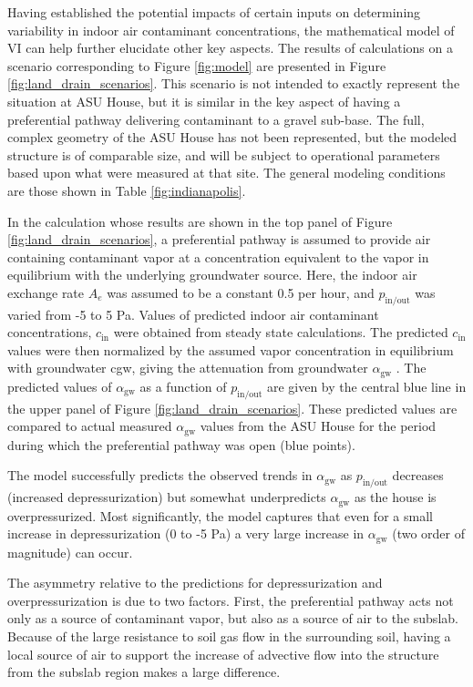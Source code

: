 \documentclass[journal=esthag,manuscript=article]{achemso}
\begin{document}
Having established the potential impacts of certain inputs on determining variability in indoor air contaminant concentrations, the mathematical model of VI can help further elucidate other key aspects.
The results of calculations on a scenario corresponding to Figure \ref{fig:model} are presented in Figure \ref{fig:land_drain_scenarios}.
This scenario is not intended to exactly represent the situation at ASU House, but it is similar in the key aspect of having a preferential pathway delivering contaminant to a gravel sub-base.
The full, complex geometry of the ASU House has not been represented, but the modeled structure is of comparable size, and will be subject to operational parameters based upon what were measured at that site.
The general modeling conditions are those shown in Table \ref{fig:indianapolis}.

In the calculation whose results are shown in the top panel of Figure \ref{fig:land_drain_scenarios}, a preferential pathway is assumed to provide air containing contaminant vapor at a concentration equivalent to the vapor in equilibrium with the underlying groundwater source.
Here, the indoor air exchange rate $A_e$ was assumed to be a constant 0.5 per hour, and $p_\mathrm{in/out}$ was varied from -5 to 5 Pa.
Values of predicted indoor air contaminant concentrations, $c_\mathrm{in}$ were obtained from steady state calculations. The predicted $c_\mathrm{in}$ values were then normalized by the assumed vapor concentration in equilibrium with groundwater  cgw, giving the attenuation from groundwater $\alpha_\mathrm{gw}$ .
The predicted values of $\alpha_\mathrm{gw}$ as a function of $p_\mathrm{in/out}$ are given by the central blue line in the upper panel of Figure \ref{fig:land_drain_scenarios}.
These predicted values are compared to actual measured $\alpha_\mathrm{gw}$ values from the ASU House for the period during which the preferential pathway was open (blue points).\par

The model successfully predicts the observed trends in $\alpha_\mathrm{gw}$ as $p_\mathrm{in/out}$ decreases (increased depressurization) but somewhat underpredicts $\alpha_\mathrm{gw}$ as the house is overpressurized.
Most significantly, the model captures that even for a small increase in depressurization (0 to -5 Pa) a very large increase in $\alpha_\mathrm{gw}$ (two order of magnitude) can occur.

The asymmetry relative to the predictions for depressurization and overpressurization is due to two factors.
First, the preferential pathway acts not only as a source of contaminant vapor, but also  as a source of air to the subslab.
Because of the large resistance to soil gas flow in the surrounding soil, having a local source of air to support the increase of advective flow into the structure from the subslab region makes a large difference.
\end{document}
